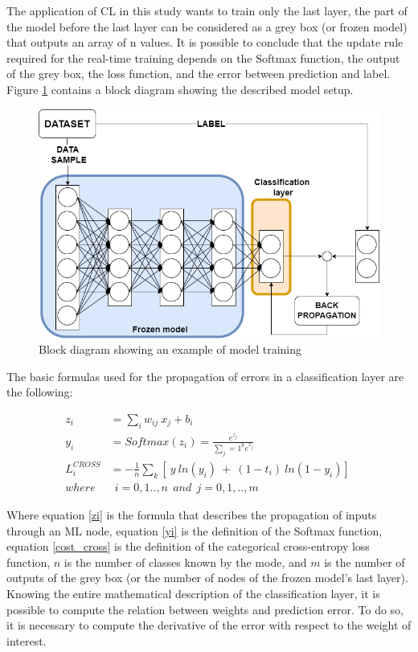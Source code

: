 \documentclass[12pt]{report}
\begin{document}
The application of CL in this study wants to train only the last layer, the part of the  model before the last layer can be considered as a grey box (or frozen model) that outputs an array of n values. It is possible to conclude that the update rule required for the real-time training depends on the Softmax function, the output of the grey box, the loss function, and the error between prediction and label. Figure \ref{fig:block_diag_esempio} contains a block diagram showing the described model setup. \\

\begin{figure}[h!]
    \centering
    \includegraphics[width=120mm]{Figures/Chapter3/basicsystem.png} 
    \caption{Block diagram showing an example of model training}
    \label{fig:block_diag_esempio}    
\end{figure}

The basic formulas used for the propagation of errors in a classification layer are the following:

\begin{align} 
	z_i &= \sum_i w_{ij} \: x_j + b_i \label{zi} \\ 
	y_i &= Softmax(z_i) = \frac{e^{z_j}}{\sum_j=1^k e^{z_j}} 	\label{yi} \\
	L^{CROSS}_i &= - \frac{1}{n} \sum_k [\ y \: ln(y_i) \: +\: (1-t_i) \: ln(1-y_i) ]\ \label{cost_cross} \\
	where & \: \: i= 0,1..,n  \: \: and \: \:  j=0,1,..,m \nonumber 
\end{align}

Where equation \ref{zi} is the formula that describes the propagation of inputs through an ML node, equation \ref{yi} is the definition of the Softmax function, equation \ref{cost_cross} is the definition of the categorical cross-entropy loss function, $n$ is the number of classes known by the mode, and $m$ is the number of outputs of the grey box (or the number of nodes of the frozen model's last layer).\\
Knowing the entire mathematical description of the classification layer, it is possible to compute the relation between weights and prediction error. To do so, it is necessary to compute the derivative of the error with respect to the weight of interest. 
\end{document}
